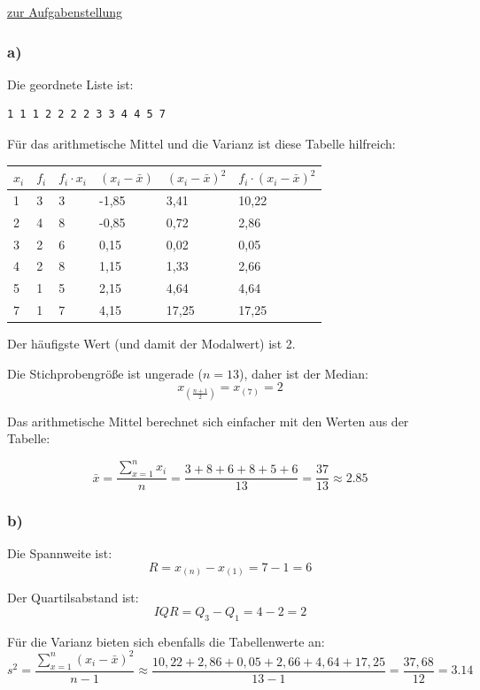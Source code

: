 \documentclass[
  11pt,
  ngerman,
  a4paper,
]{report}
\begin{document}
\protect\hyperlink{aufgabe-2-3}{zur Aufgabenstellung}

\hypertarget{a-4}{%
\subsubsection{a)}\label{a-4}}

Die geordnete Liste ist:

\begin{verbatim}
1 1 1 2 2 2 2 3 3 4 4 5 7
\end{verbatim}

Für das arithmetische Mittel und die Varianz ist diese Tabelle hilfreich:

\begin{table}[H]
\centering
\begin{tabular}{llllll}
\toprule
$x_i$ & $f_i$ & $f_i\cdot x_i$ & $(x_i-\bar{x})$ & $(x_i-\bar{x})^2$ & $f_i\cdot(x_i-\bar{x})^2$\\
\midrule
1 & 3 & 3 & -1,85 & 3,41 & 10,22\\
2 & 4 & 8 & -0,85 & 0,72 & 2,86\\
3 & 2 & 6 & 0,15 & 0,02 & 0,05\\
4 & 2 & 8 & 1,15 & 1,33 & 2,66\\
5 & 1 & 5 & 2,15 & 4,64 & 4,64\\
7 & 1 & 7 & 4,15 & 17,25 & 17,25\\
\bottomrule
\end{tabular}
\end{table}

Der häufigste Wert (und damit der Modalwert) ist 2.

Die Stichprobengröße ist ungerade (\(n=13\)), daher ist der Median: \[x_{(\frac{n+1}{2})} = x_{(7)} = 2\]

Das arithmetische Mittel berechnet sich einfacher mit den Werten aus der Tabelle:

\[\bar{x}={\displaystyle\frac{\sum\limits_{x=1}^nx_i}{n}}=\frac{3+8+6+8+5+6}{13}=\frac{37}{13}\approx2.85\]

\hypertarget{b-4}{%
\subsubsection{b)}\label{b-4}}

Die Spannweite ist: \[R=x_{(n)}-x_{(1)}=7-1=6\]

Der Quartilsabstand ist: \[\mathit{IQR}=Q_3-Q_1=4-2=2\]

Für die Varianz bieten sich ebenfalls die Tabellenwerte an: \[s^2=\frac{\sum\limits_{x=1}^n(x_i-\bar{x})^2}{n-1}\approx\frac{10,22+ 2,86+ 0,05+ 2,66+ 4,64+17,25}{13-1}=\frac{37,68}{12}=3.14\]
\end{document}
